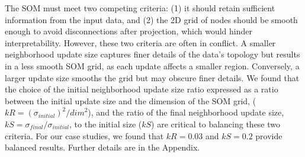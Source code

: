 The SOM must meet two competing criteria: (1) it should retain sufficient information from the input data, and (2) the 2D grid of nodes should be smooth enough to avoid disconnections after projection, which would hinder interpretability.
%
However, these two criteria are often in conflict. 
%
%
%
%
%
A smaller neighborhood update size captures finer details of the data’s topology but results in a less smooth SOM grid, as each update affects a smaller region. 
%
Conversely, a larger update size smooths the grid but may obscure finer details.
%
We found that the choice of the initial neighborhood update size ratio expressed as a ratio between the initial update size and the dimension of the SOM grid, ($kR=(\sigma_{initial})^2/ {dim}^2$), and the ratio of the final neighborhood update size, $kS=\sigma_{final}/ \sigma_{initial}$, to the initial size ($kS$) are critical to balancing these two criteria.
%
For our case studies, we found that $kR=0.03$ and $kS=0.2$ provide balanced results.
%
Further details are in the Appendix.




